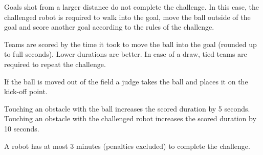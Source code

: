 Goals shot from a larger distance do not complete the challenge. In this case, the challenged robot is required to walk into the goal, move the ball outside of the goal and score another goal according to the rules of the challenge.

Teams are scored by the time it took to move the ball into the goal (rounded up to full seconds). Lower durations are better. In case of a draw, tied teams are required to repeat the challenge.

If the ball is moved out of the field a judge takes the ball and places it on the kick-off point.

Touching an obstacle with the ball increases the scored duration by 5 seconds. Touching an obstacle with the challenged robot increases the scored duration by 10 seconds.

A robot has at most 3 minutes (penalties excluded) to complete the challenge.
